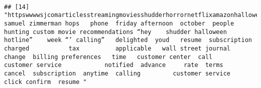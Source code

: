 \documentclass[
]{article}
\begin{document}
\begin{verbatim}
                                                                                                                                                                                                                                                                                                                                                                                                                                                                   
## [14] "httpswwwwsjcomarticlesstreamingmoviesshudderhorrornetflixamazonhalloween samuel zimmerman hops   phone  friday afternoon  october  people hunting custom movie recommendations “hey    shudder halloween hotline”    week “’ calling”   delighted  youd   resume  subscription    charged           tax          applicable   wall street journal           change  billing preferences   time   customer center  call         customer service            notified  advance     rate  terms           cancel  subscription  anytime  calling         customer service         click confirm  resume "                                                                                                                                                                                                                                                                                                                                                                                                                                                                                                                                                                                                                                                                                                                                                                                                                                                                                                                                                                                                                                                                                                                                                                                                                                                                                                                                                                                                                                                                                                                                                                                                                                                                                                                                                                                                                                                                                                                                                                                                                                                                                                                                                                                                                                                                                                                                                                    
\end{verbatim}
\end{document}
